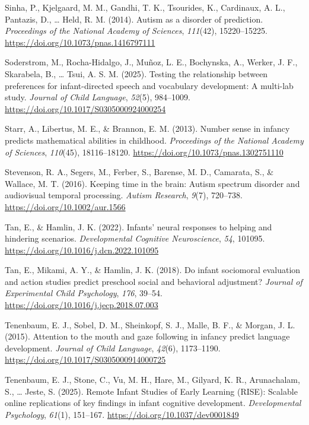 \documentclass[
  english,
  man,floatsintext]{apa6}
\newlength{\cslhangindent}
\newenvironment{CSLReferences}[2] %
 {\begin{list}{}{%
  \setlength{\itemindent}{0pt}
  \setlength{\leftmargin}{0pt}
  \setlength{\parsep}{0pt}
  \ifodd #1
   \setlength{\leftmargin}{\cslhangindent}
   \setlength{\itemindent}{-1\cslhangindent}
  \fi
  \setlength{\itemsep}{#2\baselineskip}}}
 {\end{list}}
\begin{document}
\begin{CSLReferences}{1}{0}
Sinha, P., Kjelgaard, M. M., Gandhi, T. K., Tsourides, K., Cardinaux, A. L., Pantazis, D., \ldots{} Held, R. M. (2014). Autism as a disorder of prediction. \emph{Proceedings of the National Academy of Sciences}, \emph{111}(42), 15220--15225. \url{https://doi.org/10.1073/pnas.1416797111}

Soderstrom, M., Rocha-Hidalgo, J., Muñoz, L. E., Bochynska, A., Werker, J. F., Skarabela, B., \ldots{} Tsui, A. S. M. (2025). Testing the relationship between preferences for infant-directed speech and vocabulary development: {A} multi-lab study. \emph{Journal of Child Language}, \emph{52}(5), 984--1009. \url{https://doi.org/10.1017/S0305000924000254}

Starr, A., Libertus, M. E., \& Brannon, E. M. (2013). Number sense in infancy predicts mathematical abilities in childhood. \emph{Proceedings of the National Academy of Sciences}, \emph{110}(45), 18116--18120. \url{https://doi.org/10.1073/pnas.1302751110}

Stevenson, R. A., Segers, M., Ferber, S., Barense, M. D., Camarata, S., \& Wallace, M. T. (2016). Keeping time in the brain: {Autism} spectrum disorder and audiovisual temporal processing. \emph{Autism Research}, \emph{9}(7), 720--738. \url{https://doi.org/10.1002/aur.1566}

Tan, E., \& Hamlin, J. K. (2022). Infants' neural responses to helping and hindering scenarios. \emph{Developmental Cognitive Neuroscience}, \emph{54}, 101095. \url{https://doi.org/10.1016/j.dcn.2022.101095}

Tan, E., Mikami, A. Y., \& Hamlin, J. K. (2018). Do infant sociomoral evaluation and action studies predict preschool social and behavioral adjustment? \emph{Journal of Experimental Child Psychology}, \emph{176}, 39--54. \url{https://doi.org/10.1016/j.jecp.2018.07.003}

Tenenbaum, E. J., Sobel, D. M., Sheinkopf, S. J., Malle, B. F., \& Morgan, J. L. (2015). Attention to the mouth and gaze following in infancy predict language development. \emph{Journal of Child Language}, \emph{42}(6), 1173--1190. \url{https://doi.org/10.1017/S0305000914000725}

Tenenbaum, E. J., Stone, C., Vu, M. H., Hare, M., Gilyard, K. R., Arunachalam, S., \ldots{} Jeste, S. (2025). Remote {Infant Studies} of {Early Learning} ({RISE}): {Scalable} online replications of key findings in infant cognitive development. \emph{Developmental Psychology}, \emph{61}(1), 151--167. \url{https://doi.org/10.1037/dev0001849}


\end{CSLReferences}
\end{document}
